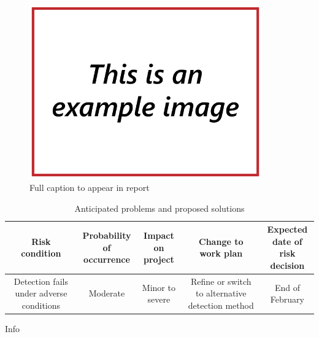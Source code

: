 \begin{figure}
\includegraphics[width=100mm,natwidth=640,natheight=480]{"./image/Example"}
\caption[Short caption for list of figures.]{\label{fig:example}Full caption to appear in report}
\end{figure}



\begin{table}
\caption{\label{tab:contingency}Anticipated problems and proposed solutions}
\begin{tabular}{c|c|c|c|c}

\parbox[t]{2cm}{Risk\\condition} & \parbox[t]{2.5cm}{Probability\\of occurrence} & \parbox[t]{3cm}{Impact on\\project} & \parbox[t]{3cm}{Change to\\work plan} & \parbox[t]{2.4cm}{Expected\\date of risk\\decision}\\[1.6cm]
\hline

\parbox[t]{2cm}{Detection fails under adverse conditions}&
\parbox[t]{2.5cm}{Moderate}&
\parbox[t]{3cm}{Minor to severe}&
\parbox[t]{3cm}{Refine or switch to alternative detection method}&
\parbox[t]{2.4cm}{End of February}\\

\end{tabular}
\end{table}


 Info
\cite{label}
